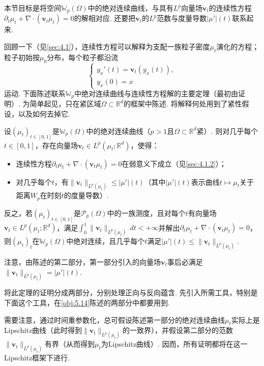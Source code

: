 本节目标是将空间$\mathbb W_p(\Omega)$中的绝对连续曲线，与具有$L^p$向量场$\mathbf v_t$的连续性方程$\partial_t\mu_t+\nabla\cdot(\mathbf v_t\mu_t)=0$的解相对应. 还要把$\mathbf v_t$的$L^p$范数与度量导数$|\mu'|(t)$联系起来.

回顾一下（见\autoref{sec:4.1}），连续性方程可以解释为支配一族粒子密度$\mu_t$演化的方程；粒子初始按$\mu_0$分布，每个粒子都沿流
\[
\begin{cases}
y_x'(t)=\mathbf v_t(y_x(t)),\\
y_x(0)=x
\end{cases}
\]
运动. 下面陈述联系$\mathbb W_p$中绝对连续曲线与连续性方程解的主要定理（最初由\cite{b15}证明）. 为简单起见，只在紧区域$\Omega\subset\mathbb R^d$的框架中陈述. 将解释何处用到了紧性假设，以及如何去掉它.

\begin{theorem}\label{obj:5.14}
设$(\mu_t)_{t\in[0,1]}$是$\mathbb W_p(\Omega)$中的绝对连续曲线（$p>1$且$\Omega\subset\mathbb R^d$紧）. 则对几乎每个$t\in[0,1]$，存在向量场$\mathbf v_t\in L^p(\mu_t;\mathbb R^d)$，使得：
\begin{itemize}
\item 连续性方程$\partial_t\mu_t+\nabla\cdot(\mathbf v_t\mu_t)=0$在弱意义下成立（见\autoref{sec:4.1.2}）；
\item 对几乎每个$t$，有$\|\mathbf v_t\|_{L^p(\mu_t)}\le|\mu'|(t)$（其中$|\mu'|(t)$表示曲线$t\mapsto\mu_t$关于距离$W_p$在时刻$t$的度量导数）.
\end{itemize}
反之，若$(\mu_t)_{t\in[0,1]}$是$\mathscr P_p(\Omega)$中的一族测度，且对每个$t$有向量场$\mathbf v_t\in L^p(\mu_t;\mathbb R^d)$，满足$\int_0^1\|\mathbf v_t\|_{L^p(\mu_t)}\,dt<+\infty$并解出$\partial_t\mu_t+\nabla\cdot(\mathbf v_t\mu_t)=0$，则$(\mu_t)_t$在$\mathbb W_p(\Omega)$中绝对连续，且几乎每个$t$满足$|\mu'|(t)\le\|\mathbf v_t\|_{L^p(\mu_t)}$.
\end{theorem}

\begin{remark}\label{obj:5.15}
注意，由陈述的第二部分，第一部分引入的向量场$\mathbf v_t$事后必满足$\|\mathbf v_t\|_{L^p(\mu_t)}=|\mu'|(t)$.
\end{remark}

将此定理的证明分成两部分，分别处理正向与反向蕴含. 先引入所需工具，特别是下面这个工具，在\autoref{obj:5.14}陈述的两部分中都要用到.

\begin{remark}\label{obj:5.16}
需要注意，通过时间重参数化，总可假设陈述第一部分的绝对连续曲线$\mu_t$实际上是Lipschitz曲线（此时得到$\|\mathbf v_t\|_{L^p(\mu_t)}$的一致界），并假设第二部分的范数$\|\mathbf v_t\|_{L^p(\mu_t)}$有界（从而得到$\mu_t$为Lipschitz曲线）. 因而，所有证明都将在这一Lipschitz框架下进行.
\end{remark}

